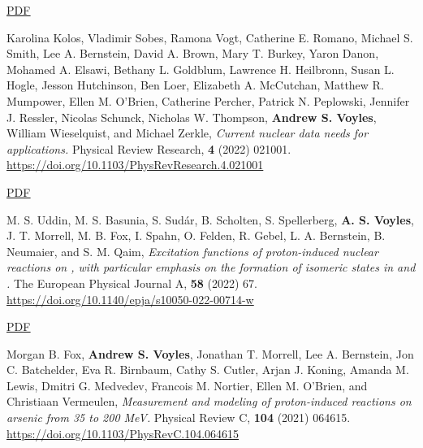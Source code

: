\begin{bibsection}
\ifshort \vspace{0.1cm} \href{https://avoyles.github.io/papers/Stevenson2022_dogbones.pdf}{\underline{PDF}} \else  \fi 

\item Karolina Kolos,  Vladimir Sobes,  Ramona Vogt, Catherine E. Romano,  Michael S. Smith,  Lee A. Bernstein, David A. Brown,  Mary T. Burkey,  Yaron Danon,  Mohamed A. Elsawi,  Bethany L. Goldblum, Lawrence H. Heilbronn,  Susan L. Hogle,  Jesson Hutchinson,  Ben Loer,  Elizabeth A. McCutchan, Matthew R. Mumpower,  Ellen M. O’Brien,  Catherine Percher,  Patrick N. Peplowski,  Jennifer J. Ressler, Nicolas Schunck,  Nicholas W. Thompson,  \textbf{Andrew S. Voyles},  William Wieselquist,  and Michael Zerkle, \emph{Current nuclear data needs for applications.} Physical Review Research, \textbf{4} (2022) 021001. \url{https://doi.org/10.1103/PhysRevResearch.4.021001} 

\ifshort \vspace{0.1cm} \href{https://avoyles.github.io/papers/Kolos2022_WANDA.pdf}{\underline{PDF}} \else  \fi 

\item M. S. Uddin, M. S. Basunia, S. Sudár, B. Scholten, S. Spellerberg, \textbf{A. S. Voyles}, J. T. Morrell, M. B. Fox, I. Spahn, O. Felden, R. Gebel, L. A. Bernstein, B. Neumaier, and S. M. Qaim, \emph{Excitation functions of proton-induced nuclear reactions on , with particular emphasis on the formation of isomeric states in  and .} The European Physical Journal A, \textbf{58} (2022) 67. \url{https://doi.org/10.1140/epja/s10050-022-00714-w} 

\ifshort \vspace{0.1cm} \href{https://avoyles.github.io/papers/Uddin2022_86Sr.pdf}{\underline{PDF}} \else  \fi 

\item Morgan B. Fox,  \textbf{Andrew S. Voyles}, Jonathan T. Morrell,  Lee A. Bernstein, Jon C. Batchelder, Eva R. Birnbaum,  Cathy S. Cutler,  Arjan J. Koning,  Amanda M. Lewis,  Dmitri G. Medvedev, Francois M. Nortier,  Ellen M. O’Brien,  and Christiaan Vermeulen, \emph{Measurement and modeling of proton-induced reactions on arsenic from 35 to 200 MeV.} Physical Review C, \textbf{104} (2021) 064615. \url{https://doi.org/10.1103/PhysRevC.104.064615} 


\end{bibsection}
